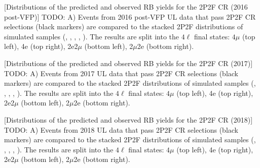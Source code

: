 \begin{multiFigure}
	\centering
		[Distributions of the predicted and observed RB yields for the 2P2F CR (2016 post-VFP)]
		{TODO:
		\;A)
		Events from 2016 post-VFP UL data that pass 2P2F CR selections (black markers) 
		are compared to the stacked 2P2F distributions of simulated samples
		(\Zplusjets, \ttbarplusjets, \WZ, \ZZ, \Zgammastar).
		The results are split into the $4\ell$ final states:
		$4\mu$ (top left), 4e (top right), 2e2$\mu$ (bottom left), 2$\mu$2e (bottom right).}
	\label{cr_plots_2p2f_2016postvfp}
\end{multiFigure}
\begin{multiFigure}
	\centering
		[Distributions of the predicted and observed RB yields for the 2P2F CR (2017)]
		{TODO:
		\;A)
		Events from 2017 UL data that pass 2P2F CR selections (black markers) 
		are compared to the stacked 2P2F distributions of simulated samples
		(\Zplusjets, \ttbarplusjets, \WZ, \ZZ, \Zgammastar).
		The results are split into the $4\ell$ final states:
		$4\mu$ (top left), 4e (top right), 2e2$\mu$ (bottom left), 2$\mu$2e (bottom right).}
	\label{cr_plots_2p2f_2017}
\end{multiFigure}
\begin{multiFigure}
		[Distributions of the predicted and observed RB yields for the 2P2F CR (2018)]
		{TODO:
		\;A)
		Events from 2018 UL data that pass 2P2F CR selections (black markers) 
		are compared to the stacked 2P2F distributions of simulated samples
		(\Zplusjets, \ttbarplusjets, \WZ, \ZZ, \Zgammastar).
		The results are split into the $4\ell$ final states:
		$4\mu$ (top left), 4e (top right), 2e2$\mu$ (bottom left), 2$\mu$2e (bottom right).}
	\label{cr_plots_2p2f_2018}
\end{multiFigure}

